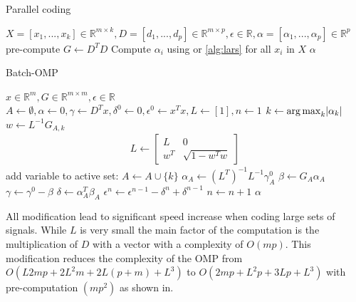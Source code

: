 \begin{algorithm}
\caption{Parallel coding}
\label{alg:parallel}
\begin{algorithmic}[1]
\REQUIRE $X =[x_1,...,x_k]  \in \mathbb{R}^{m \times k}, D  =[d_1,...,d_p]  \in
\mathbb{R}^{m\times p}, \epsilon \in \mathbb{R}, \alpha =
[\alpha_1,...,\alpha_p] \in
\mathbb{R}^{p}$
\STATE pre-compute $G \gets D^TD$
\STATE Compute $\alpha_i$ using  or
\ref{alg:lars} for all ${x_i}$ in $X$
\ENDFOR
\RETURN $\alpha$
\end{algorithmic}
\end{algorithm}

\begin{algorithm}
\caption{Batch-OMP}
\label{alg:batchOMP}
\begin{algorithmic}[1]
\REQUIRE $x \in \mathbb{R}^{m}, G  \in
\mathbb{R}^{m\times m}, \epsilon \in \mathbb{R}$
\STATE $A \gets \emptyset,\alpha \gets 0,\gamma \gets D^Tx,\delta^0 \gets
0, \epsilon^0\gets x^Tx,L\gets[1],n\gets1$
\STATE $k \gets \operatorname*{arg\,max}_k\lvert \alpha_k \rvert$
\STATE $w \gets L^{-1}G_{A,k}$
\STATE
\begin{align}
L \gets \left[
\begin{array}{ccc}
L & 0\\
w^T & \sqrt{1-w^Tw}
\end{array}
\right]
\end{align}
\ENDIF
\STATE add variable to active set: $A \gets A \cup \{ k\}$
\STATE $\alpha_A \gets (L^T)^{-1}L^{-1}\gamma_A^0$
\STATE $\beta \gets G_A\alpha_A$
\STATE $\gamma \gets \gamma^0-\beta$
\STATE $\delta \gets \alpha_A^T\beta_A$
\STATE $\epsilon^n \gets \epsilon^{n-1} - \delta^n + \delta^{n-1}$
\STATE $n \gets n+1$
\ENDWHILE
\RETURN $\alpha$
\end{algorithmic}
\end{algorithm}


All modification lead to significant speed increase when coding large sets of
signals. While $L$ is very small the main factor of the computation is
the multiplication of $D$ with a vector with a complexity of $O(mp)$. 
This modification reduces the complexity of the OMP from $O\left(L2mp + 2L^2m +
2L(p+m) + L^3\right)$ to $O\left(2mp + L^2p + 3Lp + L^3\right)$ 
with pre-computation $\left(mp^2\right)$ as shown in\cite{Rubinstein2008}. 


